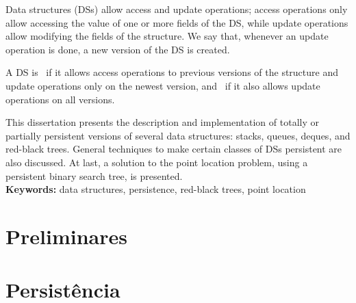 \documentclass[11pt,oneside,a4paper, openany]{book}
\begin{document}
Data structures (DSs) allow access and update operations; access operations only allow accessing the value of one or more fields of the DS, while update operations allow modifying the fields of the structure. We say that, whenever an update operation is done, a new version of the DS is created.

A DS is~ if it allows access operations to previous versions of the structure and update operations only on the newest version, and~ if it also allows update operations on all versions.

This dissertation presents the description and implementation of totally or partially persistent versions of several data structures: stacks, queues, deques, and red-black trees. General techniques to make certain classes of DSs persistent are also discussed. At last, a solution to the point location problem, using a persistent binary search tree, is presented.
\\

\noindent \textbf{Keywords:} data structures, persistence, red-black trees, point location


\setcounter{tocdepth}{1}

\begingroup
\let\cleardoublepage\clearpage
\tableofcontents
\endgroup

\mainmatter
{}



\part{Preliminares} \label{part:prelim}
%





\part{Persistência} \label{part:persist}
%












%
%
%





\end{document}
